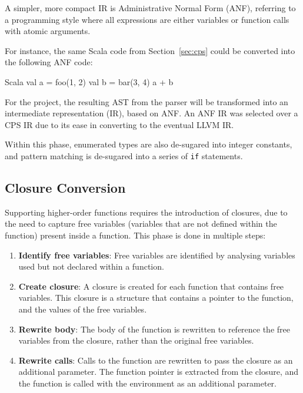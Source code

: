 A simpler, more compact IR is Administrative Normal Form (ANF), referring to a programming style
where all expressions are either variables or function calls with atomic arguments.

For instance, the same Scala code from Section~\ref{sec:cps} could be converted into the following
ANF code:

\begin{code}{Scala}
    val a = foo(1, 2)
    val b = bar(3, 4)
    a + b
\end{code}

For the project, the resulting AST from the parser will be transformed into an intermediate
representation (IR), based on ANF. An ANF IR was selected over a CPS IR due to its ease in
converting to the eventual LLVM IR.

Within this phase, enumerated types are also de-sugared into integer constants, and pattern matching
is de-sugared into a series of \texttt{if} statements.

\subsection{Closure Conversion}

Supporting higher-order functions requires the introduction of closures, due to the need to capture
free variables (variables that are not defined within the function) present inside a function. This
phase is done in multiple steps:

\begin{enumerate}
      \item \textbf{Identify free variables}: Free variables are identified by analysing variables
            used but not declared within a function.

      \item \textbf{Create closure}: A closure is created for each function that contains free
            variables. This closure is a structure that contains a pointer to the function, and the
            values of the free variables.

      \item \textbf{Rewrite body}: The body of the function is rewritten to reference the free
            variables from the closure, rather than the original free variables.

      \item \textbf{Rewrite calls}: Calls to the function are rewritten to pass the closure as an
            additional parameter. The function pointer is extracted from the closure, and the
            function is called with the environment as an additional parameter.
\end{enumerate}

